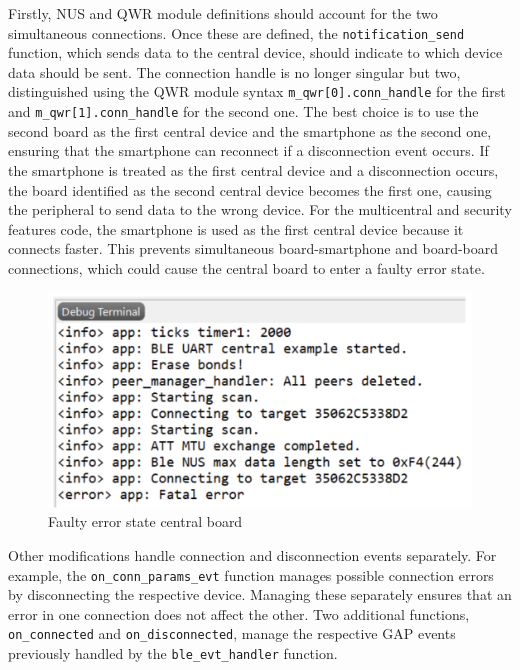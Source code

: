 \documentclass{Configuration_Files/PoliMi3i_thesis}
\begin{document}
Firstly, NUS and QWR module definitions should account for the two simultaneous connections. Once these are defined, the \texttt{notification\_send} function, which sends data to the central device, should indicate to which device data should be sent. The connection handle is no longer singular but two, distinguished using the QWR module syntax \texttt{m\_qwr[0].conn\_handle} for the first and \texttt{m\_qwr[1].conn\_handle} for the second one. The best choice is to use the second board as the first central device and the smartphone as the second one, ensuring that the smartphone can reconnect if a disconnection event occurs. If the smartphone is treated as the first central device and a disconnection occurs, the board identified as the second central device becomes the first one, causing the peripheral to send data to the wrong device. For the multicentral and security features code, the smartphone is used as the first central device because it connects faster. This prevents simultaneous board-smartphone and board-board connections, which could cause the central board to enter a faulty error state.

\begin{figure}[H]
    \centering
    \includegraphics[scale=0.6]{Multicentral/5.png}
    \caption{Faulty error state central board}
    \label{multicentral_5}
\end{figure}

Other modifications handle connection and disconnection events separately. For example, the \texttt{on\_conn\_params\_evt} function manages possible connection errors by disconnecting the respective device. Managing these separately ensures that an error in one connection does not affect the other. Two additional functions, \texttt{on\_connected} and \texttt{on\_disconnected}, manage the respective GAP events previously handled by the \texttt{ble\_evt\_handler} function.
\end{document}
